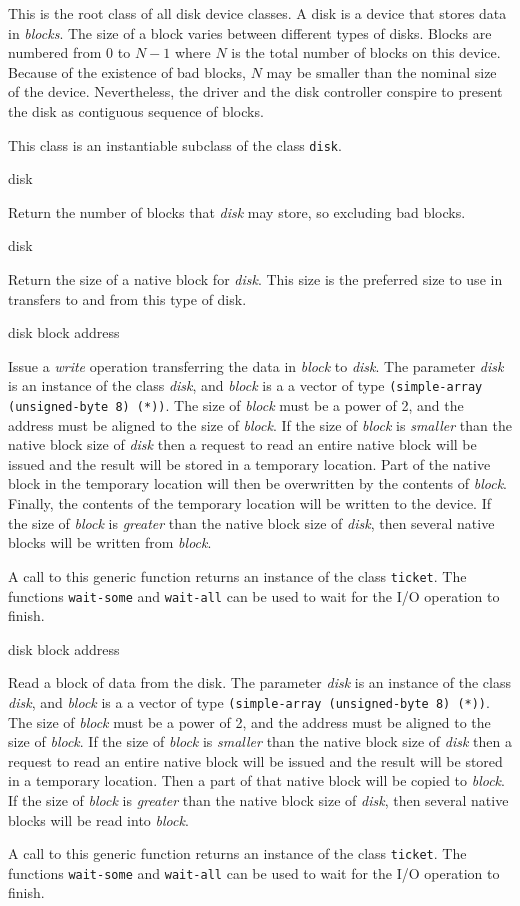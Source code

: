 
This is the root class of all disk device classes.  A disk is a device
that stores data in \emph{blocks}.  The size of a block varies between
different types of disks.  Blocks are numbered from $0$ to $N-1$ where
$N$ is the total number of blocks on this device.  Because of the
existence of bad blocks, $N$ may be smaller than the nominal size of
the device.  Nevertheless, the driver and the disk controller conspire
to present the disk as contiguous sequence of blocks. 


This class is an instantiable subclass of the class \texttt{disk}. 

 {disk}

Return the number of blocks that \textit{disk} may store, so excluding
bad blocks.

 {disk}

Return the size of a native block for \textit{disk}.  This size is the
preferred size to use in transfers to and from this type of disk.

 {disk block address}

Issue a \emph{write} operation transferring the data in \textit{block}
to \textit{disk}.  The parameter \textit{disk} is an
instance of the class \textit{disk}, and \textit{block} is a a vector
of type \texttt{(simple-array (unsigned-byte 8) (*))}.  The size of
\textit{block} must be a power of 2, and the address must be aligned
to the size of \textit{block}.  If the size of \textit{block} is
\emph{smaller} than the native block size of \textit{disk} then a
request to read an entire native block will be issued and the result
will be stored in a temporary location.  Part of the native block in
the temporary location will then be overwritten by the contents of
\textit{block}.  Finally, the contents of the temporary location will
be written to the device.  If the size of \textit{block} is
\emph{greater} than the native block size of \textit{disk}, then
several native blocks will be written from \textit{block}.

A call to this generic function returns an instance of the class
\texttt{ticket}.  The functions \texttt{wait-some} and
\texttt{wait-all} can be used to wait for the I/O operation to finish.

 {disk block address}

Read a block of data from the disk.  The parameter \textit{disk} is an
instance of the class \textit{disk}, and \textit{block} is a a vector
of type \texttt{(simple-array (unsigned-byte 8) (*))}.  The size of
\textit{block} must be a power of 2, and the address must be aligned
to the size of \textit{block}.  If the size of \textit{block} is
\emph{smaller} than the native block size of \textit{disk} then a
request to read an entire native block will be issued and the result
will be stored in a temporary location.  Then a part of that native
block will be copied to \textit{block}.  If the size of \textit{block}
is \emph{greater} than the native block size of \textit{disk}, then
several native blocks will be read into \textit{block}.

A call to this generic function returns an instance of the class
\texttt{ticket}.  The functions \texttt{wait-some} and
\texttt{wait-all} can be used to wait for the I/O operation to finish.

